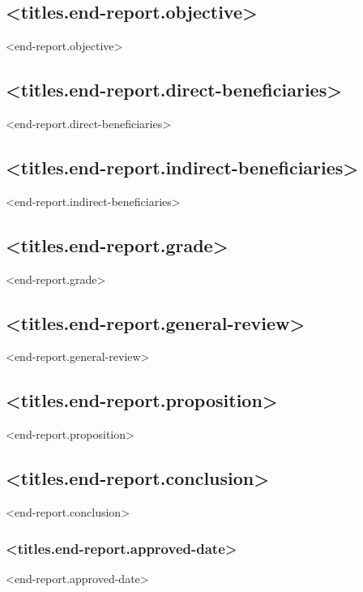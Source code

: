 \documentclass[twoside,a4paper]{article}
\begin{document}
		\subsection*{<titles.end-report.objective>}
		    <end-report.objective>
		
		\subsection*{<titles.end-report.direct-beneficiaries>}
		    <end-report.direct-beneficiaries>
		
		\subsection*{<titles.end-report.indirect-beneficiaries>}
		    <end-report.indirect-beneficiaries>
		
		\subsection*{<titles.end-report.grade>}
		    <end-report.grade>
		
		\subsection*{<titles.end-report.general-review>}
		    <end-report.general-review>
	
	    \subsection*{<titles.end-report.proposition>}
		<end-report.proposition>
		
	    \subsection*{<titles.end-report.conclusion>}		
		<end-report.conclusion>
		
		\subsubsection*{<titles.end-report.approved-date>}
		<end-report.approved-date>
	
\end{document}
